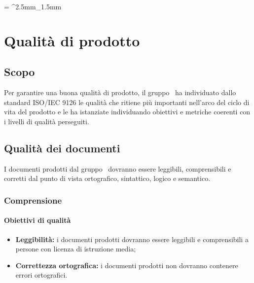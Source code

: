\documentclass[PianoDiQualifica.tex]{subfiles}
\begin{document}
	
\tabulinesep = ^2.5mm_1.5mm

\chapter{Qualità di prodotto}

\section{Scopo}
Per garantire una buona qualità di prodotto, il gruppo \gruppo\ ha individuato dallo standard ISO/IEC 9126 le qualità che ritiene più importanti nell’arco del ciclo di vita del prodotto e le ha istanziate individuando obiettivi e metriche coerenti con i livelli di qualità perseguiti.

\section{Qualità dei documenti}
I documenti prodotti dal gruppo \gruppo\ dovranno essere leggibili, comprensibili e corretti dal punto di vista ortografico, sintattico, logico e semantico.
\subsection{Comprensione}
\subsubsection{Obiettivi di qualità}
\begin{itemize}
	\item \textbf{Leggibilità:} i documenti prodotti dovranno essere leggibili e comprensibili a persone con licenza di istruzione media;
	\item \textbf{Correttezza ortografica:} i documenti prodotti non dovranno contenere errori ortografici.
\end{itemize}
\end{document}
